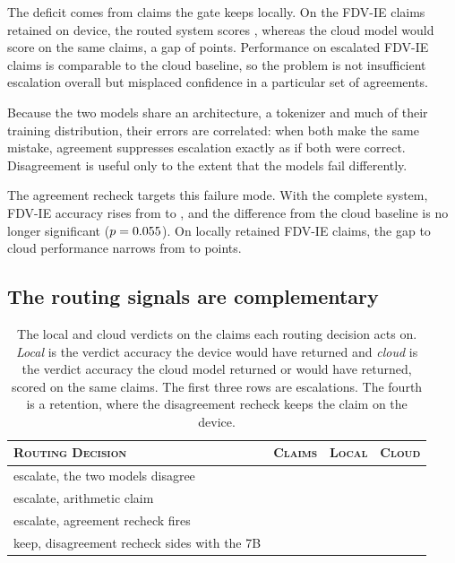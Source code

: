 \documentclass{article}
\begin{document}
The deficit comes from claims the gate keeps locally. On the \keptLocalIEn{} FDV-IE claims retained on device, the routed system scores \keptLocalIERouted{}, whereas the cloud model would score \keptLocalIECloud{} on the same claims, a gap of \keptLocalIEGap{} points. Performance on escalated FDV-IE claims is comparable to the cloud baseline, so the problem is not insufficient escalation overall but misplaced confidence in a particular set of agreements.

Because the two models share an architecture, a tokenizer and much of their training distribution, their errors are correlated: when both make the same mistake, agreement suppresses escalation exactly as if both were correct. Disagreement is useful only to the extent that the models fail differently.

The agreement recheck targets this failure mode. With the complete system, FDV-IE accuracy rises from \accRoutedIE{} to \accFullIE{}, and the difference from the cloud baseline is no longer significant ($p = 0.055{}$). On locally retained FDV-IE claims, the gap to cloud performance narrows from \keptLocalIEGap{} to \fullKeptLocalIEGap{} points.

\subsection{The routing signals are complementary}
\label{sec:triggers}

\begin{table}[t]
\caption{The local and cloud verdicts on the claims each routing decision acts on.
\emph{Local} is the verdict accuracy the device would have returned and \emph{cloud} is the verdict accuracy
the cloud model returned or would have returned, scored on the same claims. The first three
rows are escalations. The fourth is a retention, where the disagreement recheck keeps the claim
on the device.}
\label{tab:routing}
\centering
\begin{tabular}{lccc}
\toprule
\textsc{Routing Decision}
 & \textsc{Claims} & \textsc{Local} & \textsc{Cloud} \\
\midrule
escalate, the two models disagree& \trigDisagreeN{} & \trigDisagreeSevenB{}   & \trigDisagreeCloud{} \\
escalate, arithmetic claim       & \trigNumericN{}  & \trigNumericSevenB{}    & \trigNumericCloud{} \\
escalate, agreement recheck fires& \auditFired{}    & \auditLocalWouldScore{} & \auditCloudScored{} \\
keep, disagreement recheck sides with the 7B & \arbKept{}       & \arbKeptScore{}         & \arbCloudOnSame{} \\
\bottomrule
\end{tabular}
\end{table}
\end{document}
